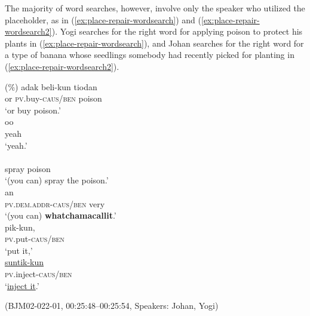 \documentclass[output=paper,colorlinks,citecolor=brown
\ChapterDOI{10.5281/zenodo.15697585}
]{langscibook}
\begin{document}
The majority of word searches, however, involve only the speaker who utilized the placeholder, as in (\ref{ex:place-repair-wordsearch}) and (\ref{ex:place-repair-wordsearch2}). Yogi searches for the right word for applying poison to protect his plants in (\ref{ex:place-repair-wordsearch}), and Johan searches for the right word for a type of banana whose seedlings somebody had recently picked for planting in (\ref{ex:place-repair-wordsearch2}).

\begin{exe}
    \ex\label{ex:place-repair-wordsearch} \begin{xlist}[0\quad →A:]
         \gll
        (\%) adak beli-kun tiodan \\
        {} or \textsc{pv.}buy-\textsc{caus/ben} poison \\
        \glt `or buy poison.' \\
         \gll
        oo \\
        yeah \\
        \glt `yeah.' \\
          \\
        spray poison \\
        \glt `(you can) spray the poison.' \\
         an \\
        \textsc{pv.}\textsc{dem.addr}-\textsc{caus/ben} very \\
        \glt `(you can) \textbf{whatchamacallit}.' \\ 
        \exi{5\quad \hphantom{→Y:}} \gll
        pik-kun, \\
        \textsc{pv.}put-\textsc{caus/ben} \\
        \glt `put it,' \\
        \exi{6\quad \hphantom{→Y:}} \gll
        \uline{suntik-kun} \\
        \textsc{pv.}inject-\textsc{caus/ben} \\
        \glt `\uline{inject it}.' \\
    \end{xlist}
    \hfill (BJM02-022-01, 00:25:48–00:25:54, Speakers: Johan, Yogi) 
\end{exe}
\end{document}
